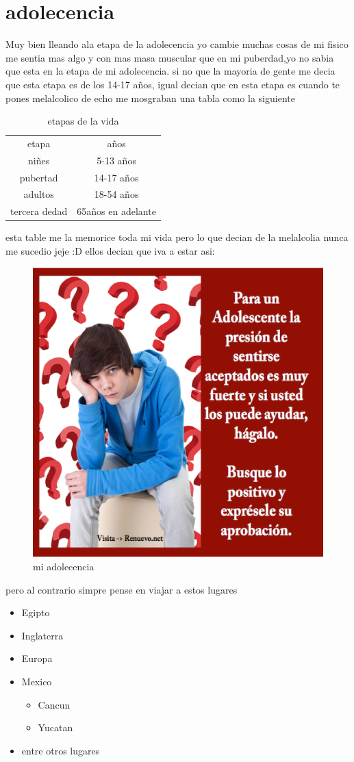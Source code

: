 \chapter{adolecencia}
Muy bien lleando ala etapa de la adolecencia yo cambie muchas cosas de mi fisico me sentia mas algo y con mas masa muscular 
que en mi puberdad,yo no sabia que esta en la etapa de mi adolecencia.
si no que la mayoria de gente me decia que esta etapa es de los 14-17 años, igual decian que en esta etapa es cuando te pones melalcolico de echo me mosgraban una tabla como la siguiente
\begin{table}
	\begin{tabular}{|c|c|}
	\hline
	etapa&años\\
	niñes&5-13 años\\
	pubertad&14-17 años\\
	adultos&18-54 años\\
	tercera dedad&65años en adelante\\
	\hline
	\end{tabular}
	\caption{etapas de la vida}
	\label{etapas.com}
\end{table}
esta table me la memorice toda mi vida pero lo que decian de la melalcolia nunca me sucedio jeje
:D
ellos decian que iva a estar asi:

\begin{figure}[H]
\centering
\includegraphics[width=1\textwidth]{fiveChapter/adolecente.eps}
\caption{mi adolecencia}
\label{adolecencia}
\end{figure}

pero al contrario simpre pense en viajar a estos lugares
\begin{itemize}
	\item Egipto
	\item Inglaterra
	\item Europa
	\item Mexico
		\begin{itemize}
			\item Cancun
			\item Yucatan
		\end{itemize}
	\item entre otros lugares
\end{itemize}
